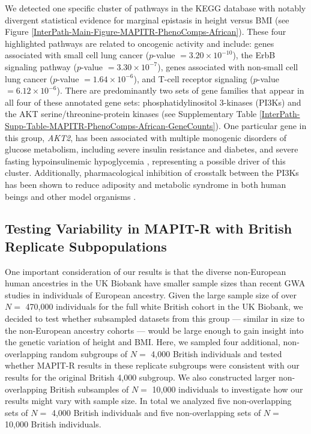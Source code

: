 \documentclass[10pt]{article}
\begin{document}
We detected one specific cluster of pathways in the KEGG database with notably divergent statistical evidence for marginal epistasis in height versus BMI (see Figure \ref{InterPath-Main-Figure-MAPITR-PhenoComps-African}). These four highlighted pathways are related to oncogenic activity and include: genes associated with small cell lung cancer ($p$-value $= 3.20\times 10^{-10}$), the ErbB signaling pathway ($p$-value $= 3.30\times 10^{-7}$), genes associated with non-small cell lung cancer ($p$-value $= 1.64\times 10^{-6}$), and T-cell receptor signaling ($p$-value $= 6.12\times 10^{-6}$). There are predominantly two sets of gene families that appear in all four of these annotated gene sets: phosphatidylinositol 3-kinases (PI3Ks) and the AKT serine/threonine-protein kinases (see Supplementary Table \ref{InterPath-Supp-Table-MAPITR-PhenoComps-African-GeneCounts}). One particular gene in this group, \textit{AKT2}, has been associated with multiple monogenic disorders of glucose metabolism, including severe insulin resistance and diabetes, and severe fasting hypoinsulinemic hypoglycemia \cite{George2004,Manning2017,Latva-Rasku2018}, representing a possible driver of this cluster. Additionally, pharmacological inhibition of crosstalk between the PI3Ks has been shown to reduce adiposity and metabolic syndrome in both human beings and other model organisms \cite{Ortega-Molina2015,Grigsby2018,Justice2017,Huang2018,Couto2019}.

\subsection*{Testing Variability in MAPIT-R with British Replicate Subpopulations}

One important consideration of our results is that the diverse non-European human ancestries in the UK Biobank have smaller sample sizes than recent GWA studies in individuals of European ancestry. Given the large sample size of over $N =$ 470,000 individuals for the full white British cohort in the UK Biobank, we decided to test whether subsampled datasets from this group --- similar in size to the non-European ancestry cohorts --- would be large enough to gain insight into the genetic variation of height and BMI. Here, we sampled four additional, non-overlapping random subgroups of $N =$ 4,000 British individuals and tested whether MAPIT-R results in these replicate subgroups were consistent with our results for the original British 4,000 subgroup. We also constructed larger non-overlapping British subsamples of $N =$ 10,000 individuals to investigate how our results might vary with sample size. In total we analyzed five non-overlapping sets of $N =$ 4,000 British individuals and five non-overlapping sets of $N =$ 10,000 British individuals.
\end{document}
